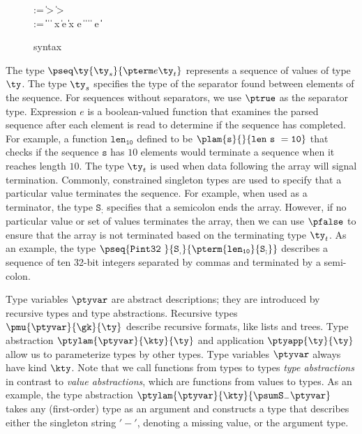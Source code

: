 \begin{figure}
\begin{bnf}
   \meta{\gk} \::= \kty \| \ity \-> \gk 
                               \| \kty \-> \gk \\
   \meta{\ty} \::= 
    \ptrue\| \pfalse \|  \| 
    \plam{\var}{\ity}{\ty} \|  \nlalt
    \psig x \ty \ty \| \psum \ty e \ty \| \pand \ty \ty \|
    \pset x \ty e \| \pseq \ty {} \nlalt
    \ptyvar       \| \pmu{\ptyvar}{\gk}{\ty} \| \ptylam{\ptyvar}{\kty}{\ty} \| \ptyapp{\ty}{\ty}
    \nlalt \pcompute e \ity \| \pabsorb \ty \| \pscan{\ty}  
\end{bnf}
\caption{\ddc{} syntax}
\label{fig:ddca-syntax}
\end{figure}

The type $\pseq \ty {\ty_s} {\pterm e {\ty_t}}$ represents a sequence
of values of type $\ty$. The type $\ty_s$ specifies the type of the
separator found between elements of the sequence. For sequences
without separators, we use $\ptrue$ as the separator type.  Expression
$e$ is a boolean-valued function that examines the parsed sequence
after each element is read to determine if the sequence has completed.
For example, a function $\mathtt{len_{10}}$ defined to be 
$\mathtt{ \plam {s}{}{len\ s \ = 10}}$ that 
checks if the sequence $\mathtt{s}$ has $10$ elements 
would terminate a sequence when it reaches length $10$.  The type
$\ty_t$ is used when data following the array will signal termination.
Commonly, constrained singleton types are used to specify that a particular
value terminates the sequence.  For example, when used as a
terminator, the type $\mathtt{S_;}$ specifies
that a semicolon ends the 
array. However, if no particular value or set of values terminates the
array, then we can use $\pfalse$
to ensure that the array is not terminated based on the terminating
type $\ty_t$.  
As an example, the type  
$\pseq {\mathtt{Pint32\ }} {\mathtt{S_,}} {\pterm {\mathtt{len_{10}}} {{\mathtt{S_;}}}}$
describes a sequence of ten 32-bit integers separated by commas and 
terminated by a semi-colon.

Type variables $\ptyvar$ are abstract descriptions; they are
introduced by recursive types and type abstractions. Recursive types
$\pmu{\ptyvar}{\gk}{\ty}$ describe recursive formats, like lists and
trees. Type abstraction $\ptylam{\ptyvar}{\kty}{\ty}$ and application
$\ptyapp{\ty}{\ty}$ allow us to parameterize types by other types.
Type variables $\ptyvar$ always have kind $\kty$. Note that we call
functions from types to types {\em type abstractions} in contrast to
{\em value abstractions}, which are functions from values to types.
As an example,
the type abstraction 
$\ptylam{\ptyvar}{\kty}{\psum \mathtt{S_-} {\ptyvar} }$ 
takes any (first-order) type as an argument and 
constructs a type that describes either the
singleton string $\mathtt{'-'}$, denoting a missing value, or the argument type.


